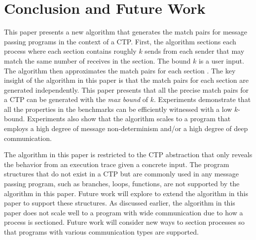 \section{Conclusion and Future Work}
This paper presents a new algorithm that generates the match pairs for message passing programs in the context of a CTP.
First, the algorithm sections each process where each section contains roughly $k$ sends from each sender that may match the same number of receives in the section. The bound $k$ is a user input.
The algorithm then approximates the match pairs for each section \cite{DBLP:conf/kbse/HuangMM13}. The key insight of the algorithm in this paper is that the match pairs for each section are generated independently. 
This paper presents that all the precise match pairs for a CTP can be generated with the \textit{max bound} of $k$. Experiments demonstrate that all the properties in the benchmarks can be efficiently witnessed with a low $k$-bound. Experiments also show that the algorithm scales to a program that employs a high degree of message non-determinism and/or a high degree of deep communication.

The algorithm in this paper is restricted to the CTP abstraction that only reveals the behavior from an execution trace given a concrete input. The program structures that do not exist in a CTP but are commonly used in any message passing program, such as branches, loops, functions, are not supported by the algorithm in this paper. Future work will explore to extend the algorithm in this paper to support these structures. As discussed earlier, the algorithm in this paper does not scale well to a program with wide communication due to how a process is sectioned. Future work will consider new ways to section processes so that programs with various communication types are supported.



